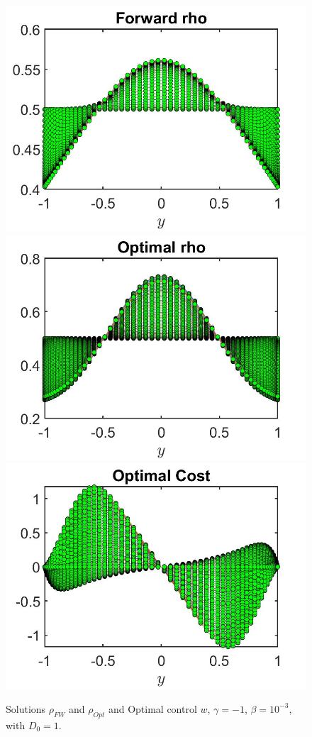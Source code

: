 \documentclass[11pt, a4paper]{article}
\theoremstyle{definition}
\begin{document}
\begin{figure}[h]
	\includegraphics[scale=0.3]{rhoFWM2.jpg}	\includegraphics[scale=0.3]{rhoOptM2.jpg}
	\includegraphics[scale=0.3]{wOptM2.jpg}
	\caption{Solutions $\rho_{FW}$ and $\rho_{Opt}$ and Optimal control $w$, $\gamma = - 1$, $\beta = 10^{-3}$, with $D_0 = 1$.}
	\label{rhoM1}
\end{figure}
\end{document}
